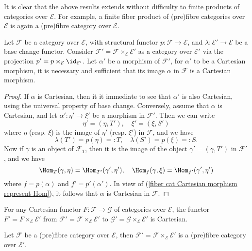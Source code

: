 It is clear that the above results extends without difficulty to finite products of categories over $\mathcal{E}$. For example, a finite fiber product of (pre)fibre categories over $\mathcal{E}$ is again a (pre)fibre category over $\mathcal{E}$.
\begin{proposition}\label{fibre cat morphism Cartesian iff base change}
Let $\mathcal{F}$ be a category over $\mathcal{E}$, with structural functor $p:\mathcal{F}\to \mathcal{E}$, and $\lambda:\mathcal{E}'\to \mathcal{E}$ be a base change functor. Consider $\mathcal{F}'=\mathcal{F}\times_\mathcal{E}\mathcal{E}'$ as a category over $\mathcal{E}'$ via the projection $p'=p\times_\mathcal{E}\id_{\mathcal{E}'}$. Let $\alpha'$ be a morphism of $\mathcal{F}'$, for $\alpha'$ to be a Cartesian morphism, it is necessary and sufficient that its image $\alpha$ in $\mathcal{F}$ is a Cartesian morphism.
\end{proposition}
\begin{proof}
If $\alpha$ is Cartesian, then it it immediate to see that $\alpha'$ is also Cartesian, using the universal property of base change. Conversely, assume that $\alpha$ is Cartesian, and let $\alpha':\eta'\to \xi'$ be a morphism in $\mathcal{F}'$. Then we can write
\[\eta'=(\eta,T'),\quad \xi'=(\xi,S')\]
where $\eta$ (resp. $\xi$) is the image of $\eta'$ (resp. $\xi'$) in $\mathcal{F}$, and we have
\[\lambda(T')=p(\eta)=:T,\quad \lambda(S')=p(\xi)=:S.\]
Now if $\gamma$ is an object of $\mathcal{F}_T$, then it is the image of the object $\gamma'=(\gamma,T')$ in $\mathcal{F}'$, and we have
\[\Hom_T(\gamma,\eta)=\Hom_{T'}(\gamma',\eta'),\quad \Hom_f(\gamma,\xi)=\Hom_{f'}(\gamma',\eta')\]
where $f=p(\alpha)$ and $f'=p'(\alpha')$. In view of (\ref{fiber cat Cartesian morphism represent Hom}), it follows that $\alpha$ is Cartesian in $\mathcal{F}$. 
\end{proof}
\begin{corollary}\label{fibre cat functor base change is Cartesian}
For any Cartesian functor $F:\mathcal{F}\to \mathcal{G}$ of categories over $\mathcal{E}$, the functor $F'=F\times_\mathcal{E}\mathcal{E}'$ from $\mathcal{F}'=\mathcal{F}\times_\mathcal{E}\mathcal{E}'$ to $\mathcal{G}'=\mathcal{G}\times_\mathcal{E}\mathcal{E}'$ is Cartesian.
\end{corollary}
\begin{corollary}\label{fibre cat base change is fibre}
Let $\mathcal{F}$ be a (pre)fibre category over $\mathcal{E}$, then $\mathcal{F}'=\mathcal{F}\times_\mathcal{E}\mathcal{E}'$ is a (pre)fibre category over $\mathcal{E}'$.
\end{corollary}
